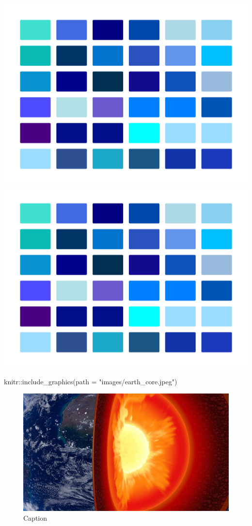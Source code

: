 \documentclass[
]{article}
\newenvironment{Shaded}{\begin{snugshade}}{\end{snugshade}}
\newcommand{\AttributeTok}[1]{\textcolor[rgb]{0.77,0.63,0.00}{#1}}
\newcommand{\FunctionTok}[1]{\textcolor[rgb]{0.00,0.00,0.00}{#1}}
\newcommand{\NormalTok}[1]{#1}
\newcommand{\SpecialCharTok}[1]{\textcolor[rgb]{0.00,0.00,0.00}{#1}}
\newcommand{\StringTok}[1]{\textcolor[rgb]{0.31,0.60,0.02}{#1}}
\begin{document}
\color{blue}\href{https://it.wikipedia.org/wiki/Cielo}{\includegraphics{images/blues.png}}\normalcolor
\includegraphics{images/blues.png}

\begin{Shaded}
\begin{Highlighting}[]
\NormalTok{knitr}\SpecialCharTok{::}\FunctionTok{include\_graphics}\NormalTok{(}\AttributeTok{path =} \StringTok{"images/earth\_core.jpeg"}\NormalTok{)}
\end{Highlighting}
\end{Shaded}

\begin{figure}

\hfill{}\includegraphics[width=0.1\linewidth]{images/earth_core} 

\caption{Caption}\label{fig:unnamed-chunk-1}
\end{figure}
\end{document}
